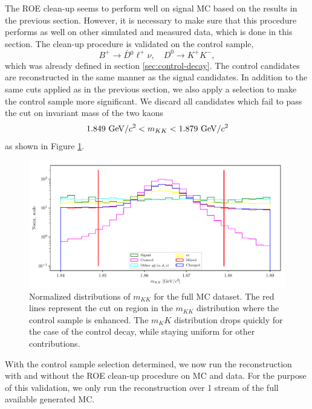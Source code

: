 The ROE clean-up seems to perform well on signal MC based on the results in the previous section. However, it is necessary to make sure that this procedure performs as well on other simulated and measured data, which is done in this section. The clean-up procedure is validated on the control sample, $$B^+ \to \bar D {}^0 \ell^+ \nu,\quad D^0 \to K^+K^-,$$
which was already defined in section \ref{sec:control-decay}. The control candidates are reconstructed in the same manner as the signal candidates. In addition to the same cuts applied as in the previous section, we also apply a selection to make the control sample more significant. We discard all candidates which fail to pass the cut on invariant mass of the two kaons
\begin{equation}
1.849\mathrm{~GeV}/c^2 < m_{KK} < 1.879\mathrm{~GeV}/c^2
\end{equation}
as shown in Figure \ref{fig:roe_mKK}.
\begin{figure}[H]
	\centering
	\captionsetup{width=0.8\linewidth}
	\includegraphics[width=\linewidth]{fig/roe_mKK_cut}
	\caption{Normalized distributions of $m_{KK}$ for the full MC dataset. The red lines represent the cut on region in the $m_{KK}$ distribution where the control sample is enhanced. The $m_KK$ distribution drops quickly for the case of the control decay, while staying uniform for other contributions.}
	\label{fig:roe_mKK}
\end{figure}

With the control sample selection determined, we now run the reconstruction with and without the ROE clean-up procedure on MC and data. For the purpose of this validation, we only run the reconstruction over 1 stream of the full available generated MC. 


